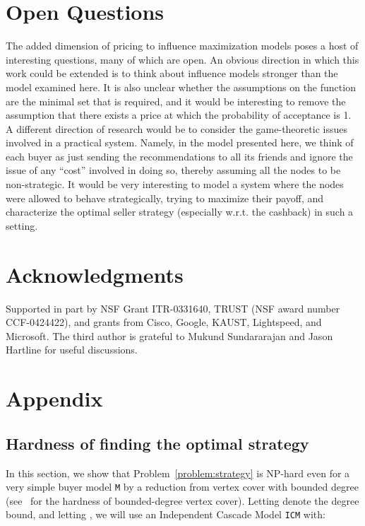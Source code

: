 \documentclass[letterpaper,twoside]{article}
\newcommand{\M}{\texttt{M}}
\newcommand{\ICM}[1]{\texttt{ICM}}
\begin{document}
\section{Open Questions}
The added dimension of pricing to influence maximization models poses a host
of interesting questions, many of which are open. An obvious direction in
which this work could be extended is to think about influence models stronger
than the model examined here. It is also unclear whether the assumptions on
the function  are the minimal set that is required, and it would be
interesting to remove the assumption that there exists a price at which the
probability of acceptance is 1. A different direction of research would be to
consider the game-theoretic issues involved in a practical system. Namely, in
the model presented here, we think of each buyer as just sending the
recommendations to all its friends and ignore the issue of any ``cost''
involved in doing so, thereby assuming all the nodes to be non-strategic. It
would be very interesting to model a system where the nodes were allowed to
behave strategically, trying to maximize their payoff, and characterize the
optimal seller strategy (especially w.r.t. the cashback) in such a setting.

\section{Acknowledgments}
Supported in part by NSF Grant ITR-0331640, TRUST (NSF award number
CCF-0424422), and grants from Cisco, Google, KAUST, Lightspeed, and
Microsoft. The third author is grateful to Mukund Sundararajan and Jason
Hartline for useful discussions.




\section{Appendix}
\vspace{2mm}
\subsection{Hardness of finding the optimal strategy}
\label{sec:nphard}
In this section, we show that Problem~\ref{problem:strategy} is
NP-hard even for a very simple buyer model \M{} by a reduction from
vertex cover with bounded degree (see~\cite{GJ79} for the hardness of
bounded-degree vertex cover). Letting  denote the degree
bound, and letting , we will use an Independent
Cascade Model \ICM{C} with:
\end{document}
